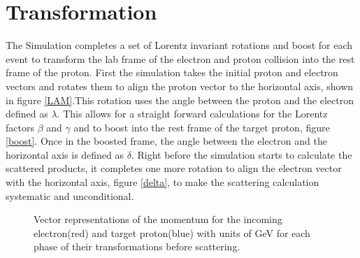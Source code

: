 \section{Transformation}
The Simulation completes a set of Lorentz invariant  rotations and boost for each event to transform the lab frame of the electron and proton collision into the rest frame of the proton. First the simulation takes the initial proton and electron vectors and rotates them to align the proton vector to the horizontal axis, shown in figure \ref{LAM}.This rotation uses the angle between the proton and the electron defined as $\lambda$. This allows for a straight forward calculations for the Lorentz factors $\beta$ and $\gamma $ and to boost into the rest frame of the target proton, figure \ref{boost}. Once in the boosted frame, the angle between the electron and the horizontal axis is defined as $\delta$.  Right before the simulation starts to calculate the scattered products, it completes one more rotation to align the electron vector with the horizontal axis, figure \ref{delta}, to make the scattering calculation systematic and unconditional. 

\begin{figure}[t]
  \centering
  
  \quad
  \centering
  \vspace{-2cm}
  \centering
  \quad
  \centering
  
  \caption{Vector representations of the momentum for the incoming electron(red) and  target proton(blue) with units of GeV for each phase of their transformations before scattering.}
  \label{transform}
  \end{figure}
  
